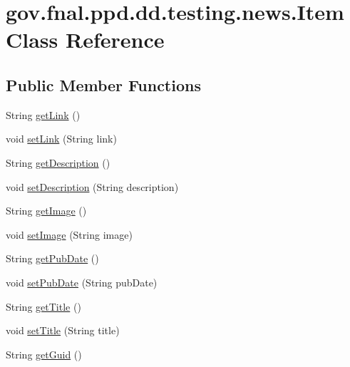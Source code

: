 \hypertarget{classgov_1_1fnal_1_1ppd_1_1dd_1_1testing_1_1news_1_1Item}{\section{gov.\-fnal.\-ppd.\-dd.\-testing.\-news.\-Item Class Reference}
\label{classgov_1_1fnal_1_1ppd_1_1dd_1_1testing_1_1news_1_1Item}
}
\subsection*{Public Member Functions}
\begin{DoxyCompactItemize}
\item 
String \hyperlink{classgov_1_1fnal_1_1ppd_1_1dd_1_1testing_1_1news_1_1Item_a93dfa01a7cd3f40aae94a8254e2b4cd1}{get\-Link} ()
\item 
void \hyperlink{classgov_1_1fnal_1_1ppd_1_1dd_1_1testing_1_1news_1_1Item_a51b764f78e4e17c68634943fb60ab411}{set\-Link} (String link)
\item 
String \hyperlink{classgov_1_1fnal_1_1ppd_1_1dd_1_1testing_1_1news_1_1Item_a1ae9767f009163f714c959bdafbe0485}{get\-Description} ()
\item 
void \hyperlink{classgov_1_1fnal_1_1ppd_1_1dd_1_1testing_1_1news_1_1Item_a39e6ef157f3d1422c204482bca44ff04}{set\-Description} (String description)
\item 
String \hyperlink{classgov_1_1fnal_1_1ppd_1_1dd_1_1testing_1_1news_1_1Item_a04907433ee6b9bfad0222da989fd4281}{get\-Image} ()
\item 
void \hyperlink{classgov_1_1fnal_1_1ppd_1_1dd_1_1testing_1_1news_1_1Item_a7732248eb514b5db1da4b957695ef5c2}{set\-Image} (String image)
\item 
String \hyperlink{classgov_1_1fnal_1_1ppd_1_1dd_1_1testing_1_1news_1_1Item_a0f2086ee2be859413af461796aad4c5b}{get\-Pub\-Date} ()
\item 
void \hyperlink{classgov_1_1fnal_1_1ppd_1_1dd_1_1testing_1_1news_1_1Item_a2894606116f3a77ff2121106206852a1}{set\-Pub\-Date} (String pub\-Date)
\item 
String \hyperlink{classgov_1_1fnal_1_1ppd_1_1dd_1_1testing_1_1news_1_1Item_aff117a57502c01fe147fd376ab26fea3}{get\-Title} ()
\item 
void \hyperlink{classgov_1_1fnal_1_1ppd_1_1dd_1_1testing_1_1news_1_1Item_a8092b2d5e061917b3897a612b22eedad}{set\-Title} (String title)
\item 
String \hyperlink{classgov_1_1fnal_1_1ppd_1_1dd_1_1testing_1_1news_1_1Item_a7b0b9adf9d55c102c88d2c55091ece53}{get\-Guid} ()

\end{DoxyCompactItemize}
